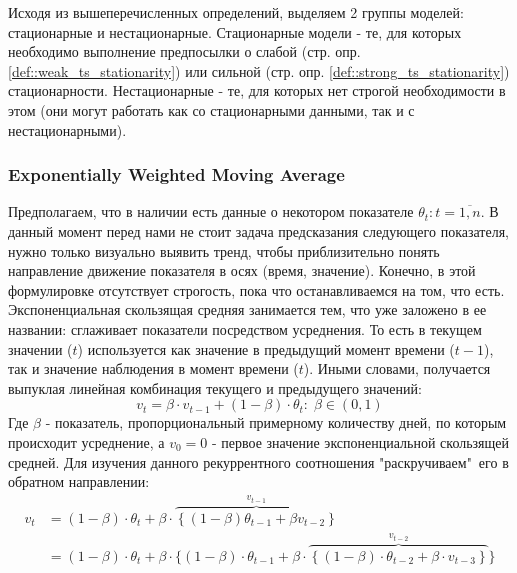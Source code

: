 		Исходя из вышеперечисленных определений, выделяем 2 группы моделей: стационарные и нестационарные. Стационарные модели - те, для которых необходимо выполнение предпосылки о слабой (стр. \pageref{def::weak_ts_stationarity} опр. \ref{def::weak_ts_stationarity}) или сильной (стр. \pageref{def::strong_ts_stationarity} опр. \ref{def::strong_ts_stationarity}) стационарности. Нестационарные - те, для которых нет строгой необходимости в этом (они могут работать как со стационарными данными, так и с нестационарными).		
		\subsubsection{Exponentially Weighted Moving Average}
			Предполагаем, что в наличии есть данные о некотором показателе $\theta_t: t = \overline{1,n}$. В данный момент перед нами не стоит задача предсказания следующего показателя, нужно только визуально выявить тренд, чтобы приблизительно понять направление движение показателя в осях (время, значение). Конечно, в этой формулировке отсутствует строгость, пока что останавливаемся на том, что есть. Экспоненциальная скользящая средняя занимается тем, что уже заложено в ее названии: сглаживает показатели посредством усреднения. То есть в текущем значении ($t$) используется как значение в предыдущий момент времени ($t - 1$), так и значение наблюдения в момент времени ($t$). Иными словами, получается выпуклая линейная комбинация текущего и предыдущего значений:
			\begin{equation}
				v_t = \beta \cdot v_{t - 1} + (1 - \beta) \cdot \theta_t: \; \beta \in (0,1)
			\end{equation}
			Где $\beta$ - показатель, пропорциональный примерному количеству дней, по которым происходит усреднение, а $v_0 = 0$ - первое значение экспоненциальной скользящей средней. Для изучения данного рекуррентного соотношения "раскручиваем"\ его в обратном направлении:
			\begin{equation}
				\begin{split}
					v_t & =  (1 - \beta) \cdot \theta_t + \beta \cdot \overbrace{\left\{(1 - \beta) \theta_{t - 1} + \beta v_{t - 2}\right\}}^{v_{t - 1}}\\
					 & =  (1 - \beta) \cdot \theta_t + \beta \cdot \{(1 - \beta) \cdot \theta_{t - 1} + \beta \cdot \overbrace{\left\{(1 - \beta) \cdot \theta_{t - 2} + \beta \cdot v_{t - 3}\right\}}^{v_{t - 2}}\}\\
				\end{split}
			\end{equation}
